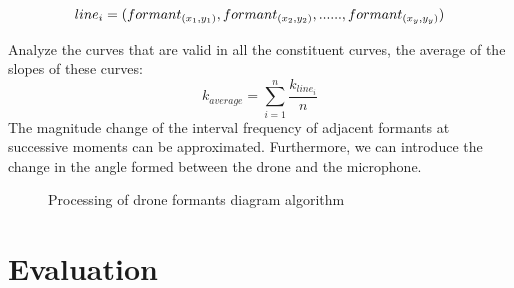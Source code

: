 \documentclass{sig-alternate-10pt}
\begin{document}
$$line_i=(formant_{(x_1,y_1)},formant_{(x_2,y_2)},......\\,formant_{(x_y,y_y)})$$



Analyze the curves that are valid in all the constituent curves, the average of the slopes of these curves:
$$k_{average}=\sum_{i=1}^n\frac{k_{{line}_i}}{n}$$
The magnitude change of the interval frequency of adjacent formants at successive moments can be approximated. Furthermore, we can introduce the change in the angle formed between the drone and the microphone.


\begin{figure}[!ht]
	\centering
	\caption{Processing of drone formants diagram algorithm}
	\label{formants}
\end{figure}



\section{Evaluation}
\end{document}

